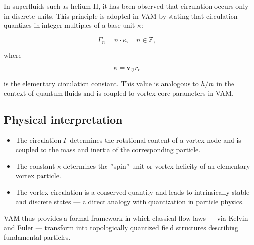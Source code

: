 In superfluids such as helium II, it has been observed that circulation occurs only in discrete units. This principle is adopted in VAM by stating that circulation quantizes in integer multiples of a base unit \( \kappa \):

\begin{equation}
    \Gamma_n = n \cdot \kappa, \quad n \in \mathbb{Z},
\end{equation}

where

\begin{equation}
    \kappa = \mathbf{v}_{\scriptscriptstyle\boldsymbol{\circlearrowleft}} r_c
\end{equation}

is the elementary circulation constant. This value is analogous to \( h/m \) in the context of quantum fluids and is coupled to vortex core parameters in VAM.

\subsection{Physical interpretation}

\begin{itemize}
    \item The circulation \( \Gamma \) determines the rotational content of a vortex node and is coupled to the mass and inertia of the corresponding particle.

    \item The constant \( \kappa \) determines the \("\)spin\("\)-unit or vortex helicity of an elementary vortex particle.
    \item The vortex circulation is a conserved quantity and leads to intrinsically stable and discrete states — a direct analogy with quantization in particle physics.
\end{itemize}

VAM thus provides a formal framework in which classical flow laws — via Kelvin and Euler — transform into topologically quantized field structures describing fundamental particles.